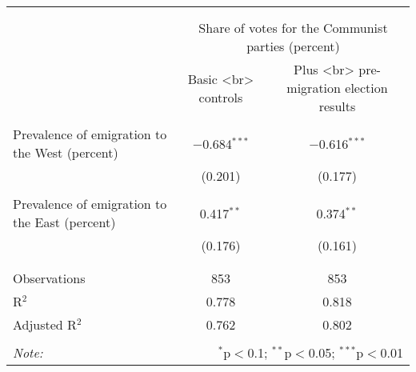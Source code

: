
\begin{table}[!htbp] \centering 
  \caption{} 
  \label{} 
\begin{tabular}{@{\extracolsep{5pt}}lcc} 
\\[-1.8ex]\hline 
\hline \\[-1.8ex] 
\\[-1.8ex] & \multicolumn{2}{c}{Share of votes for the Communist parties (percent)} \\ 
 & Basic <br> controls & Plus <br> pre-migration election results \\ 
\hline \\[-1.8ex] 
 Prevalence of emigration to the West (percent) & $-$0.684$^{***}$ & $-$0.616$^{***}$ \\ 
  & (0.201) & (0.177) \\ 
  & & \\ 
 Prevalence of emigration to the East (percent) & 0.417$^{**}$ & 0.374$^{**}$ \\ 
  & (0.176) & (0.161) \\ 
  & & \\ 
\hline \\[-1.8ex] 
Observations & 853 & 853 \\ 
R$^{2}$ & 0.778 & 0.818 \\ 
Adjusted R$^{2}$ & 0.762 & 0.802 \\ 
\hline 
\hline \\[-1.8ex] 
\textit{Note:}  & \multicolumn{2}{r}{$^{*}$p$<$0.1; $^{**}$p$<$0.05; $^{***}$p$<$0.01} \\ 
\end{tabular} 
\end{table} 
